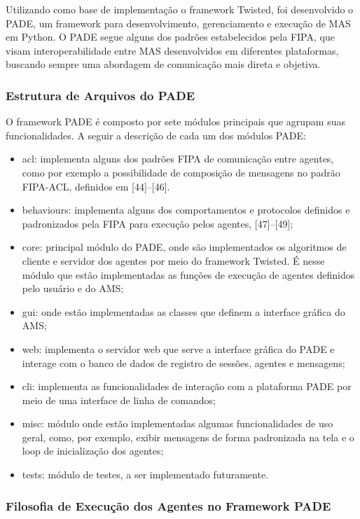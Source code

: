 \documentclass[journal]{IEEEtran}
\begin{document}
Utilizando como base de implementação o framework Twisted, foi desenvolvido o PADE, um framework para desenvolvimento, gerenciamento e execução de MAS em Python. O PADE segue alguns dos padrões estabelecidos pela FIPA, que visam interoperabilidade entre MAS desenvolvidos em diferentes plataformas, buscando sempre uma abordagem de comunicação mais direta e objetiva.

\subsubsection{Estrutura de Arquivos do PADE}

O framework PADE é composto por sete módulos principais que agrupam suas funcionalidades. A seguir a descrição de cada um dos módulos PADE:

\begin{itemize}
  \item acl: implementa alguns dos padrões FIPA de comunicação entre agentes, como por exemplo a possibilidade de composição de mensagens no padrão FIPA-ACL, definidos em [44]–[46].
  \item behaviours: implementa alguns dos comportamentos e protocolos definidos e padronizados pela FIPA para execução pelos agentes, [47]–[49];
  \item core: principal módulo do PADE, onde são implementados os algoritmos de cliente e servidor dos agentes por meio do framework Twisted. É nesse módulo que estão implementadas as funções de execução de agentes definidos pelo usuário e do AMS;
  \item gui: onde estão implementadas as classes que definem a interface gráfica do AMS;
  \item web: implementa o servidor web que serve a interface gráfica do PADE e interage com o banco de dados de registro de sessões, agentes e mensagens;
  \item cli: implementa as funcionalidades de interação com a plataforma PADE por meio de uma interface de linha de comandos;
  \item misc: módulo onde estão implementadas algumas funcionalidades de uso geral, como, por exemplo, exibir mensagens de forma padronizada na tela e o loop de inicialização dos agentes;
  \item tests: módulo de testes, a ser implementado futuramente.
\end{itemize}

\subsubsection{Filosofia de Execução dos Agentes no Framework PADE} 
\end{document}
